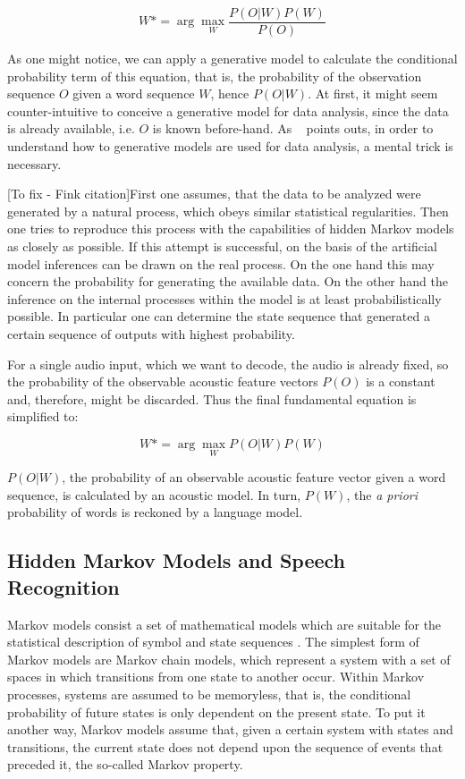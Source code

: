 \begin{equation}
W*= \arg\max_{W}\frac{P(O|W)P(W)}{P(O)}
\end{equation}

As one might notice, we can apply a generative model to calculate the conditional probability term of this
equation, that is, the probability of the observation sequence $O$ given a word sequence $W$, hence $P(O|W)$.
At first, it might seem counter-intuitive to conceive a generative model for data analysis, since the 
data is already available, i.e. $O$ is known before-hand. As \citet{Fink2008}~\citep{Fink2008} points 
outs, in order to understand how to generative models are used for data analysis, a mental trick is necessary.

[To fix - Fink citation]First one assumes, that the data
to be analyzed were generated by a natural process, which obeys similar statistical
regularities. Then one tries to reproduce this process with the capabilities of hidden
Markov models as closely as possible. If this attempt is successful, on the basis of
the artificial model inferences can be drawn on the real process. On the one hand
this may concern the probability for generating the available data. On the other hand
the inference on the internal processes within the model is at least probabilistically
possible. In particular one can determine the state sequence that generated a certain
sequence of outputs with highest probability.

For a single audio input, which we want to decode, the audio is already fixed, so the 
probability of the observable acoustic feature vectors $P(O)$ is a constant and, therefore, 
might be discarded. Thus the final fundamental equation is simplified to:

\begin{equation}
W*= \arg\max_{W}P(O|W)P(W)
\end{equation}

$P(O|W)$, the probability of an observable acoustic feature vector given a word sequence, is calculated by 
an acoustic model. In turn, $P(W)$, the \emph{a priori} probability of words is reckoned by a language model.

\subsection{Hidden Markov Models and Speech Recognition}

Markov models consist a set of mathematical models which are suitable for the statistical description of symbol
and state sequences \cite{Fink2008}. The simplest form of Markov models are Markov chain models, 
which represent a system with a set of spaces in which transitions from one state to another occur. 
Within Markov processes, systems are assumed to be memoryless, that is, the conditional probability
of future states is only dependent on the present state. To put it another way, Markov models assume that,
given a certain system with states and transitions, the current state does not depend upon the 
sequence of events that preceded it, the so-called Markov property. 

